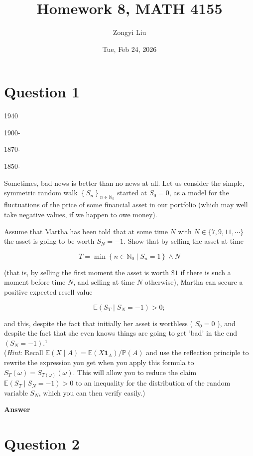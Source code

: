 \documentclass[letterpaper]{article}
\title{Homework 8, MATH 4155}
\author{Zongyi Liu}
\date{Tue, Feb 24, 2026}
\begin{document}
		\maketitle
		\section{Question 1}
		
		
	1940


	1900-

	1870-

	1850-

	
		Sometimes, bad news is better than no news at all. Let us consider the simple, symmetric random walk $\left\{S_{n}\right\}_{n \in \mathbb{N}_{0}}$ started at $S_{0}=0$, as a model for the fluctuations of the price of some financial asset in our portfolio (which may well take negative values, if we happen to owe money).
		
		Assume that Martha has been told that at some time $N$ with $N \in\{7,9,11, \cdots\}$ the asset is going to be worth $S_{N}=-1$. Show that by selling the asset at time
		
		$$
		T=\min \left\{n \in \mathbb{N}_{0} \mid S_{n}=1\right\} \wedge N
		$$
		
		(that is, by selling the first moment the asset is worth $\$ 1$ if there is such a moment before time $N$, and selling at time $N$ otherwise), Martha can secure a positive expected resell value
		
		$$
		\mathbb{E}\left(S_{T} \mid S_{N}=-1\right)>0 ;
		$$
		
		and this, despite the fact that initially her asset is worthless ( $S_{0}=0$ ), and despite the fact that she even knows things are going to get 'bad' in the end $\left(S_{N}=-1\right) .^{1}$\\
		(\emph{Hint}: Recall $\mathbb{E}(X \mid A)=\mathbb{E}\left(X \mathbf{1}_{A}\right) / \mathbb{P}(A)$ and use the reflection principle to rewrite the expression you get when you apply this formula to $S_{T}(\omega)=S_{T(\omega)}(\omega)$. This will allow you to reduce the claim $\mathbb{E}\left(S_{T} \mid S_{N}=-1\right)>0$ to an inequality for the distribution of the random variable $S_{N}$, which you can then verify easily.)
		
		
		\textbf{Answer}
		
		\clearpage
		
		\section{Question 2}
		
\end{document}
